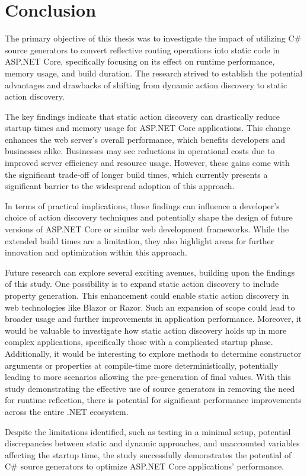\chapter{Conclusion}

The primary objective of this thesis was to investigate the impact of utilizing C\# source generators to convert reflective routing operations into static code in ASP.NET Core, specifically focusing on its effect on runtime performance, memory usage, and build duration. The research strived to establish the potential advantages and drawbacks of shifting from dynamic action discovery to static action discovery.

The key findings indicate that static action discovery can drastically reduce startup times and memory usage for ASP.NET Core applications. This change enhances the web server's overall performance, which benefits developers and businesses alike. Businesses may see reductions in operational costs due to improved server efficiency and resource usage. However, these gains come with the significant trade-off of longer build times, which currently presents a significant barrier to the widespread adoption of this approach.

In terms of practical implications, these findings can influence a developer's choice of action discovery techniques and potentially shape the design of future versions of ASP.NET Core or similar web development frameworks. While the extended build times are a limitation, they also highlight areas for further innovation and optimization within this approach.

Future research can explore several exciting avenues, building upon the findings of this study. One possibility is to expand static action discovery to include property generation. This enhancement could enable static action discovery in web technologies like Blazor or Razor. Such an expansion of scope could lead to broader usage and further improvements in application performance. Moreover, it would be valuable to investigate how static action discovery holds up in more complex applications, specifically those with a complicated startup phase. Additionally, it would be interesting to explore methods to determine constructor arguments or properties at compile-time more deterministically, potentially leading to more scenarios allowing the pre-generation of final values. With this study demonstrating the effective use of source generators in removing the need for runtime reflection, there is potential for significant performance improvements across the entire .NET ecosystem.

Despite the limitations identified, such as testing in a minimal setup, potential discrepancies between static and dynamic approaches, and unaccounted variables affecting the startup time, the study successfully demonstrates the potential of C# source generators to optimize ASP.NET Core applications' performance.